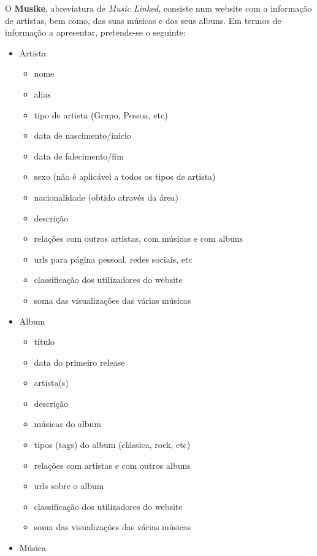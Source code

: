 \documentclass{article}
\begin{document}
O \textbf{Musike}, abreviatura de \textit{Music Linked}, consiste num website com a informação de artistas, bem como, das suas músicas e dos seus albuns. Em termos de informação a apresentar, pretende-se o seguinte:
\begin{itemize}
    \item Artista
        \begin{itemize}
            \item nome
            \item alias
            \item tipo de artista (Grupo, Pessoa, etc)
            \item data de nascimento/inicio
            \item data de falecimento/fim
            \item sexo (não é aplicável a todos os tipos de artista)
            \item nacionalidade (obtido através da área)
            \item descrição
            \item relações com outros artistas, com músicas e com albuns
            \item urls para página pessoal, redes sociais, etc
            \item classificação dos utilizadores do website
            \item soma das visualizações das várias músicas
        \end{itemize}
    \item Album
        \begin{itemize}
            \item título
            \item data do primeiro release
            \item artista(s)
            \item descrição
            \item músicas do album
            \item tipos (tags) do album (clássica, rock, etc)
            \item relações com artistas e com outros albuns
            \item urls sobre o album
            \item classificação dos utilizadores do website
            \item soma das visualizações das várias músicas
        \end{itemize}
    \item Música

\end{itemize}
\end{document}
